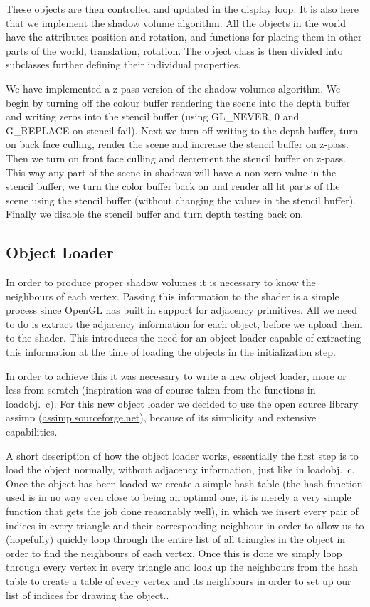 \documentclass[a4paper, 12pt]{article}
\begin{document}
These objects are then controlled and updated in the display loop. It is also here that we implement the shadow volume algorithm. All the objects in the world have the attributes position and rotation, and functions for placing them in other parts of the world, translation, rotation. The object class is then divided into subclasses further defining their individual properties.  

We have implemented a z-pass version of the shadow volumes algorithm. We begin
by turning off the colour buffer rendering the scene into the depth buffer and
writing zeros into the stencil buffer (using GL\_NEVER, 0 and G\_REPLACE on
stencil fail). Next we turn off writing to the depth buffer, turn on back face
culling, render the scene and increase the stencil buffer on z-pass. Then we
turn on front face culling and decrement the stencil buffer on z-pass. This way
any part of the scene in shadows will have a non-zero value in the stencil
buffer, we turn the color buffer back on and render all lit parts of the scene
using the stencil buffer (without changing the values in the stencil buffer).
Finally we disable the stencil buffer and turn depth testing back on.

\subsection{Object Loader}
In order to produce proper shadow volumes it is necessary to know the neighbours
of each vertex. Passing this information to the shader is a simple process since
OpenGL has built in support for adjacency primitives. All we need to do is
extract the adjacency information for each object, before we upload them to the
shader. This introduces the need for an object loader capable of extracting this
information at the time of loading the objects in the initialization step.

In order to achieve this it was necessary to write a new object loader, more or
less from scratch (inspiration was of course taken from the functions in
loadobj.~c). For this new object loader we decided to use the open source library
assimp (\url{assimp.sourceforge.net}), because of its simplicity and extensive
capabilities.

A short description of how the object loader works, essentially the first step
is to load the object normally, without adjacency information, just like in
loadobj.~c. Once the object has been loaded we create a simple hash table (the
hash function used is in no way even close to being an optimal one, it is merely
a very simple function that gets the job done reasonably well), in which we
insert every pair of indices in every triangle and their corresponding neighbour
in order to allow us to (hopefully) quickly loop through the entire list of all
triangles in the object in order to find the neighbours of each vertex. Once
this is done we simply loop through every vertex in every triangle and look up
the neighbours from the hash table to create a table of every vertex and its
neighbours in order to set up our list of indices for drawing the object..
\end{document}
